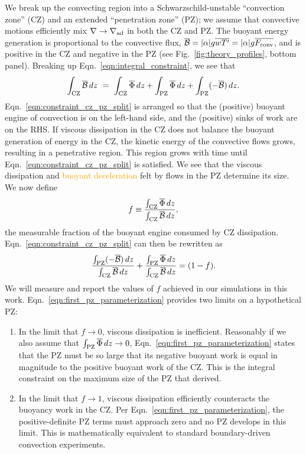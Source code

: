 \documentclass[twocolumn, linenumbers]{aastex631}
\newcommand{\gradad}{\ensuremath{\nabla_{\rm{ad}}}}
\newcommand{\justgrad}{\ensuremath{\nabla}}
\newcommand{\Fconv}{\ensuremath{F_{\rm{conv}}}}
\renewcommand{\bar}[1]{\overline{#1}}
\newcommand{\editone}[1]{\textcolor{orange}{#1}}
\begin{document}
We break up the convecting region into a Schwarzschild-unstable ``convection zone'' (CZ) and an extended ``penetration zone'' (PZ); we assume that convective motions efficiently mix $\justgrad \rightarrow \gradad$ in both the CZ and PZ.
The buoyant energy generation is proportional to the convective flux, $\bar{\mathcal{B}} = |\alpha|g\bar{w T'} = |\alpha| g \bar{\Fconv}$, and is positive in the CZ and negative in the PZ (see Fig.~\ref{fig:theory_profiles}, bottom panel).
Breaking up Eqn.~\ref{eqn:integral_constraint}, we see that
\begin{equation}
\int_{\rm{CZ}} \bar{\mathcal{B}}\,dz \,\,=\,\,
\int_{\rm{CZ}} \bar{\Phi}\,dz + \int_{\rm{PZ}} \bar{\Phi}\,dz + \int_{\rm{PZ}}(-\bar{\mathcal{B}})\,dz.
\label{eqn:constraint_cz_pz_split}
\end{equation}
Eqn.~\ref{eqn:constraint_cz_pz_split} is arranged so that the (positive) buoyant engine of convection is on the left-hand side, and the (positive) sinks of work are on the RHS.
If viscous dissipation in the CZ does not balance the buoyant generation of energy in the CZ, the kinetic energy of the convective flows grows, resulting in a penetrative region.
This region grows with time until Eqn.~\ref{eqn:constraint_cz_pz_split} is satisfied.
We see that the viscous dissipation and \editone{buoyant deceleration} felt by flows in the PZ determine its size.
We now define
\begin{equation}
f \equiv \frac{\int_{\rm{CZ}} \bar{\Phi}\,dz}{\int_{\rm{CZ}}\bar{\mathcal{B}}\,dz},
\label{eqn:f_defn}
\end{equation}
the measurable fraction of the buoyant engine consumed by CZ dissipation.
Eqn.~\ref{eqn:constraint_cz_pz_split} can then be rewritten as
\begin{equation}
\frac{\int_{\rm{PZ}}(-\bar{\mathcal{B}})\,dz}{\int_{\rm{CZ}} \bar{\mathcal{B}}\,dz}
+ \frac{\int_{\rm{PZ}} \bar{\Phi}\,dz }{\int_{\rm{CZ}} \bar{\mathcal{B}}\,dz}
= (1 - f).
\label{eqn:first_pz_parameterization}
\end{equation}
We will measure and report the values of $f$ achieved in our simulations in this work.
Eqn.~\ref{eqn:first_pz_parameterization} provides two limits on a hypothetical PZ:
\begin{enumerate}
\item In the limit that $f \rightarrow 0$, viscous dissipation is inefficient.
Reasonably if we also assume that $\int_{\rm{PZ}}\bar{\Phi}\,dz \rightarrow 0$, Eqn.~\ref{eqn:first_pz_parameterization} states that the PZ must be so large that its negative buoyant work is equal in magnitude to the positive buoyant work of the CZ.
This is the integral constraint on the maximum size of the PZ that \citet{roxburgh1989} derived.
\item In the limit that $f \rightarrow 1$, viscous dissipation efficiently counteracts the buoyancy work in the CZ.
Per Eqn.~\ref{eqn:first_pz_parameterization}, the positive-definite PZ terms must approach zero and no PZ develops in this limit.
This is mathematically equivalent to standard boundary-driven convection experiments.
\end{enumerate}
\end{document}
